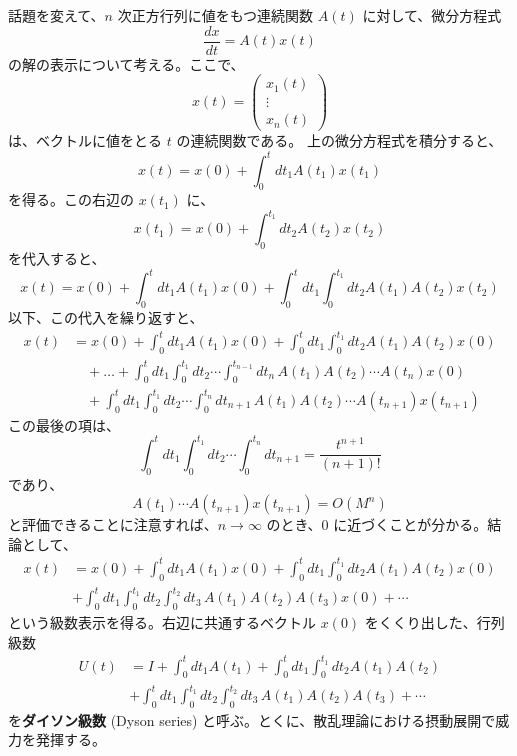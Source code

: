 \documentclass[a4paper]{jsarticle}
\theoremstyle{definition}
\theoremstyle{remark}
\begin{document}
話題を変えて、$n$ 次正方行列に値をもつ連続関数 $A(t)$ に対して、微分方程式
\[
\frac{dx}{dt} = A(t)x(t)
\]
の解の表示について考える。ここで、
\[
x(t) = 
\begin{pmatrix}
x_1(t)\\
\vdots\\
x_n(t)
\end{pmatrix}
\]
は、ベクトルに値をとる $t$ の連続関数である。
上の微分方程式を積分すると、
\[
x(t) = x(0) + \int_0^tdt_1 A(t_1)x(t_1)
\]
を得る。この右辺の $x(t_1)$ に、
\[
x(t_1) = x(0) + \int_0^{t_1}dt_2 A(t_2)x(t_2)
\]
を代入すると、
\[
x(t) = x(0) + \int_0^t dt_1 A(t_1) x(0) + 
\int_0^t dt_1 \int_0^{t_1} dt_2 A(t_1)A(t_2) x(t_2) 
\]
以下、この代入を繰り返すと、
\begin{align*}
x(t) &= x(0) + \int_0^t dt_1 A(t_1) x(0) + 
\int_0^t dt_1 \int_0^{t_1} dt_2 A(t_1)A(t_2) x(0)\\ 
&\quad+ \dots + \int_0^t dt_1 \int_0^{t_1} dt_2 \cdots 
\int_0^{t_{n-1}} dt_n\, A(t_1) A(t_2) \cdots A(t_n) x(0)\\
&\quad+ \int_0^t dt_1 \int_0^{t_1} dt_2 \cdots 
\int_0^{t_n} dt_{n+1}\, A(t_1) A(t_2) \cdots A(t_{n+1}) x(t_{n+1})
\end{align*}
この最後の項は、
\[
\int_0^t dt_1 \int_0^{t_1} dt_2 \cdots \int_0^{t_n} dt_{n+1} = \frac{t^{n+1}}{(n+1)!} 
\]
であり、
\[
A(t_1)\cdots A(t_{n+1}) x(t_{n+1}) = O(M^n)
\]
と評価できることに注意すれば、$n \to \infty$ のとき、$0$ に近づくことが分かる。結論として、
\begin{align*}
x(t) &= x(0) + \int_0^t dt_1 A(t_1) x(0) + 
\int_0^t dt_1 \int_0^{t_1} dt_2 A(t_1)A(t_2) x(0)\\ 
&+ \int_0^t dt_1 \int_0^{t_1} dt_2 
\int_0^{t_2} dt_3\, A(t_1) A(t_2) A(t_3) x(0) + \cdots 
\end{align*}
という級数表示を得る。右辺に共通するベクトル $x(0)$ をくくり出した、行列級数
\begin{align*}
U(t) &= I + \int_0^t dt_1 A(t_1)  + 
\int_0^t dt_1 \int_0^{t_1} dt_2 A(t_1)A(t_2) \\ 
&+ \int_0^t dt_1 \int_0^{t_1} dt_2 
\int_0^{t_2} dt_3\, A(t_1) A(t_2) A(t_3) + \cdots 
\end{align*}
を\textbf{ダイソン級数} (Dyson series) と呼ぶ。とくに、散乱理論における摂動展開で威力を発揮する。
\end{document}
